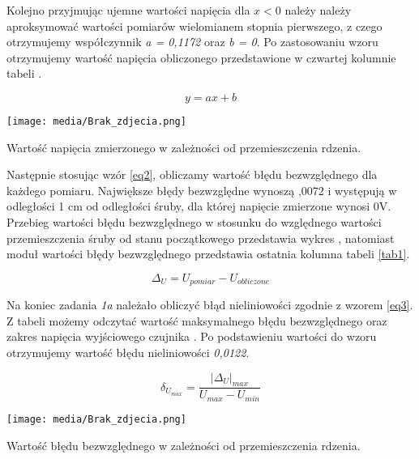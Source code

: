 \documentclass{article}
\begin{document}
\vspace{1em}
Kolejno przyjmując ujemne wartości napięcia dla $x < 0$ należy należy aproksymować wartości pomiarów wielomianem stopnia pierwszego, z czego otrzymujemy współczynnik \textit{a = 0,1172} oraz \textit{b = 0}.  Po zastosowaniu wzoru  otrzymujemy wartość napięcia obliczonego przedstawione w czwartej kolumnie tabeli . 

\begin{equation} \label{eq1}
    y = ax + b
\end{equation}
\newpage



\begin{graph}[ht]
    \centering
    \texttt{[image: media/Brak\_zdjecia.png]}
    \caption{Wartość napięcia zmierzonego w zależności od przemieszczenia rdzenia.}
    \label{wyk1}
\end{graph}

Następnie stosując wzór \ref{eq2}, obliczamy wartość błędu bezwzględnego dla każdego pomiaru. Największe błędy bezwzględne wynoszą ,0072 i występują w odległości 1 cm od odległości śruby, dla której napięcie zmierzone wynosi 0V. Przebieg wartości błędu bezwzględnego w stosunku do względnego wartości przemieszczenia śruby od stanu początkowego przedstawia wykres , natomiast moduł wartości błędy bezwzględnego przedstawia ostatnia kolumna tabeli \ref{tab1}.


\begin{equation} \label{eq2}
    \Delta_U = U_{pomiar} - U_{obliczone}
\end{equation}


\newpage
Na koniec zadania \textit{1a} należało obliczyć błąd nieliniowości zgodnie z wzorem \ref{eq3}. Z tabeli możemy odczytać wartość maksymalnego błędu bezwzględnego oraz zakres napięcia wyjściowego czujnika . Po podstawieniu wartości do wzoru otrzymujemy wartość błędu nieliniowości \textit{0,0122}.


\begin{equation} \label{eq3}
    \delta_{U_{max}} = \frac{|\Delta_U|_{max}}{U_{max} - U_{min}}
\end{equation}

\begin{graph}[ht]
    \centering
    \texttt{[image: media/Brak\_zdjecia.png]}
    \caption{Wartość błędu bezwzględnego w zależności od przemieszczenia rdzenia.}
    \label{wyk2}
\end{graph}
\end{document}

